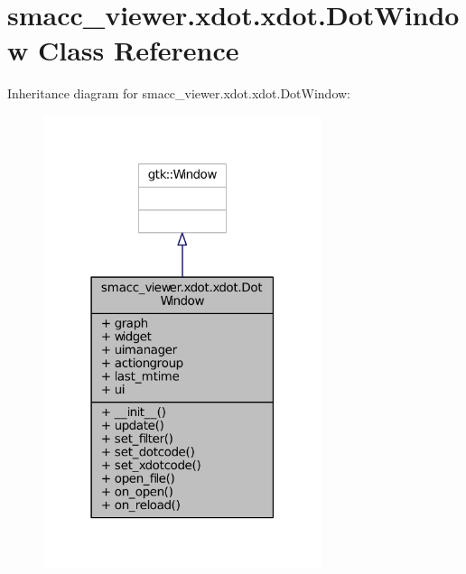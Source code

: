 \hypertarget{classsmacc__viewer_1_1xdot_1_1xdot_1_1DotWindow}{}\section{smacc\+\_\+viewer.\+xdot.\+xdot.\+Dot\+Window Class Reference}
\label{classsmacc__viewer_1_1xdot_1_1xdot_1_1DotWindow}


Inheritance diagram for smacc\+\_\+viewer.\+xdot.\+xdot.\+Dot\+Window\+:
\nopagebreak
\begin{figure}[H]
\begin{center}
\leavevmode
\includegraphics[width=231pt]{classsmacc__viewer_1_1xdot_1_1xdot_1_1DotWindow__inherit__graph}
\end{center}
\end{figure}


